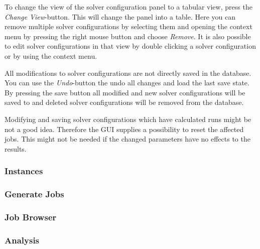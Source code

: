 To change the view of the solver configuration panel to a tabular view, press the \textit{Change View}-button. This will change the panel into a table. Here you can remove multiple solver configurations by selecting them and opening the context menu by pressing the right mouse button and choose \textit{Remove}. It is also possible to edit solver configurations in that view by double clicking a solver configuration or by using the context menu.

\attention All modifications to solver configurations are not directly saved in the database. You can use the \textit{Undo}-button the undo all changes and load the last save state. By pressing the save button all modified and new solver configurations will be saved to and deleted solver configurations will be removed from the database.

\attention Modifying and saving solver configurations which have calculated runs might be not a good idea. Therefore the GUI supplies a possibility to reset the affected jobs. This might not be needed if the changed parameters have no effects to the results.
\subsubsection{Instances}

\subsubsection{Generate Jobs}

\subsubsection{Job Browser}

\subsubsection{Analysis}